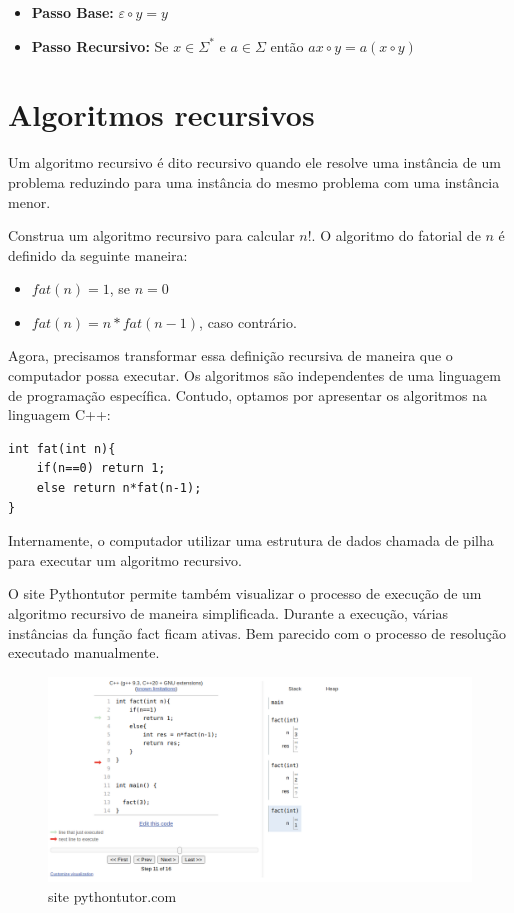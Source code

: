 \begin{itemize}
    \item \textbf{Passo Base:} $\varepsilon \circ y = y$
    \item \textbf{Passo Recursivo:}  Se $x \in \Sigma^*$ e $a \in \Sigma$ então $ ax \circ y =  a(x \circ y) $
\end{itemize}


\section{Algoritmos recursivos}

Um algoritmo recursivo é dito recursivo quando ele resolve uma instância de um problema reduzindo para uma instância do mesmo problema com uma instância menor.


\begin{exemplo}
Construa um algoritmo recursivo para calcular $n!$. O algoritmo do fatorial de $n$ é definido da seguinte maneira:

\begin{itemize}
    \item $fat(n) = 1$, se $n = 0$
    \item $fat(n) = n*fat(n-1)$, caso contrário. 
\end{itemize}

\end{exemplo}
 
Agora, precisamos transformar essa definição recursiva de maneira que o computador possa executar. Os algoritmos são independentes de uma linguagem de programação específica. Contudo, optamos por apresentar os algoritmos na linguagem C++:

\begin{verbatim}
int fat(int n){
	if(n==0) return 1;
	else return n*fat(n-1);
}
\end{verbatim}

Internamente, o computador utilizar uma estrutura de dados chamada de pilha para executar um algoritmo recursivo.

O site Pythontutor permite também visualizar o processo de execução de um algoritmo recursivo de maneira simplificada. Durante a execução, várias instâncias da função fact ficam ativas. Bem parecido com o processo de resolução executado manualmente.

\begin{figure}[htbp]
\centering
\includegraphics[scale=0.5]{images/pythontutor.png}
\caption{site pythontutor.com}
\end{figure}

